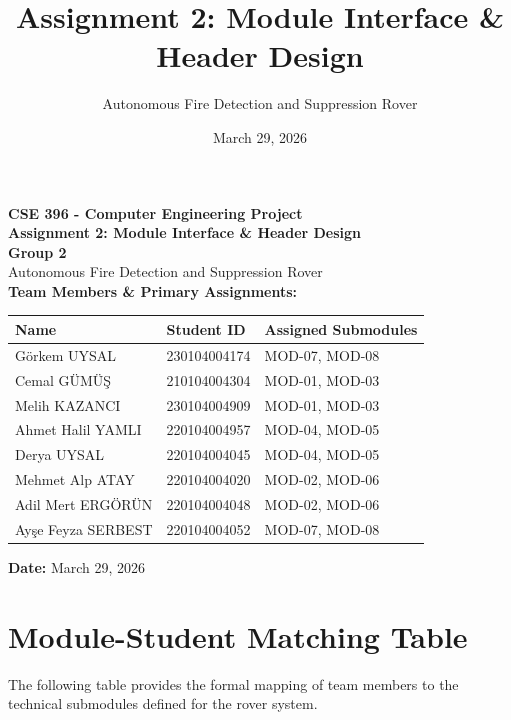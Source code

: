 \documentclass[12pt]{article}
\title{Assignment 2: Module Interface \& Header Design}
\author{Autonomous Fire Detection and Suppression Rover}
\date{March 29, 2026}
\begin{document}
\begin{titlepage}
    \centering
    \vspace*{0.5in}
    \Huge \textbf{CSE 396 - Computer Engineering Project} \\
    \vspace{0.4in}
    \huge \textbf{Assignment 2: Module Interface \& Header Design} \\
    \vspace{0.6in}
    \Large \textbf{Group 2} \\
    Autonomous Fire Detection and Suppression Rover \\
    \vspace{0.6in}
    \Large \textbf{Team Members \& Primary Assignments:} \\
    \normalsize
    \vspace{0.2in}
    \begin{tabularx}{\textwidth}{l l X}
        \textbf{Name} & \textbf{Student ID} & \textbf{Assigned Submodules} \\ \midrule
        Görkem UYSAL & 230104004174 & MOD-07, MOD-08 \\
        Cemal GÜMÜŞ & 210104004304 & MOD-01, MOD-03 \\
        Melih KAZANCI & 230104004909 & MOD-01, MOD-03 \\
        Ahmet Halil YAMLI & 220104004957 & MOD-04, MOD-05 \\
        Derya UYSAL & 220104004045 & MOD-04, MOD-05 \\
        Mehmet Alp ATAY & 220104004020 & MOD-02, MOD-06 \\
        Adil Mert ERGÖRÜN & 220104004048 & MOD-02, MOD-06 \\
        Ayşe Feyza SERBEST & 220104004052 & MOD-07, MOD-08 \\
    \end{tabularx}
    \vfill
    \Large \textbf{Date:} March 29, 2026
\end{titlepage}

\tableofcontents
\newpage

\section{Module-Student Matching Table}
The following table provides the formal mapping of team members to the technical submodules defined for the rover system.
\end{document}

